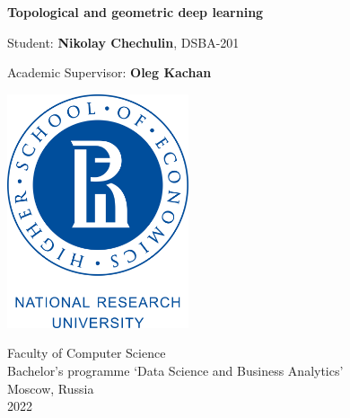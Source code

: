 \graphicspath{ {./assets/} }

\begin{titlepage}
	\begin{center}
		\vspace*{1cm}

		{\huge \textbf{Topological and geometric deep learning}}

		\vspace{0.5cm}

		\vspace{1.5cm}

		{\large Student: \textbf{Nikolay Chechulin}, DSBA-201}

		{\large Academic Supervisor: \textbf{Oleg Kachan}}

		\vfill
		\vspace{1.5cm}

		\includegraphics[width=0.4\textwidth]{Higher_School_of_Economics_Logo}

		Faculty of Computer Science\\
		Bachelor's programme `Data Science and Business Analytics'\\
		Moscow, Russia\\
		2022

	\end{center}
\end{titlepage}
